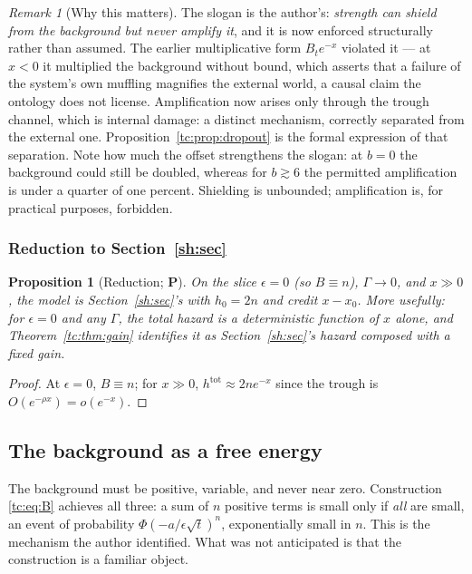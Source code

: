 \documentclass[11pt]{article}
\numberwithin{equation}{section}
\theoremstyle{plain}
\newtheorem{proposition}[theorem]{Proposition}
\theoremstyle{definition}
\theoremstyle{remark}
\newtheorem{remark}[theorem]{Remark}
\begin{document}
\begin{remark}[Why this matters]\label{tc:rem:asymmetry}
The slogan is the author's: \emph{strength can shield from the
background but never amplify it}, and it is now enforced structurally
rather than assumed. The earlier multiplicative form $B_te^{-x}$
violated it --- at $x<0$ it multiplied the background without bound,
which asserts that a failure of the system's own muffling magnifies the
external world, a causal claim the ontology does not license.
Amplification now arises only through the trough channel, which is
internal damage: a distinct mechanism, correctly separated from the
external one. Proposition~\ref{tc:prop:dropout} is the formal expression
of that separation. Note how much the offset strengthens the slogan: at
$b=0$ the background could still be doubled, whereas for $b\gtrsim6$ the
permitted amplification is under a quarter of one percent. Shielding is
unbounded; amplification is, for practical purposes, forbidden.
\end{remark}

\subsubsection{Reduction to Section~\ref{sh:sec}}\label{tc:subsub:reduction}

\begin{proposition}[Reduction; \textbf{P}]\label{tc:prop:reduction}
On the slice $\epsilon=0$ (so $B\equiv n$), $\Gamma\to0$, and $x\gg0$,
the model is Section~\ref{sh:sec}'s with $h_0=2n$ and credit $x-x_0$. More
usefully: for $\epsilon=0$ and any $\Gamma$, the total hazard is a
deterministic function of $x$ alone, and Theorem~\ref{tc:thm:gain}
identifies it as Section~\ref{sh:sec}'s hazard composed with a fixed gain.
\end{proposition}

\begin{proof}
At $\epsilon=0$, $B\equiv n$; for $x\gg0$, $h^{\mathrm{tot}}\approx
2ne^{-x}$ since the trough is $O(e^{-\rho x})=o(e^{-x})$.
\end{proof}

\subsection{The background as a free energy}\label{tc:sub:background}

The background must be positive, variable, and never near zero.
Construction \eqref{tc:eq:B} achieves all three: a sum of $n$ positive
terms is small only if \emph{all} are small, an event of probability
$\Phi(-a/\epsilon\sqrt t)^{n}$, exponentially small in $n$. This is the
mechanism the author identified. What was not anticipated is that the
construction is a familiar object.
\end{document}
